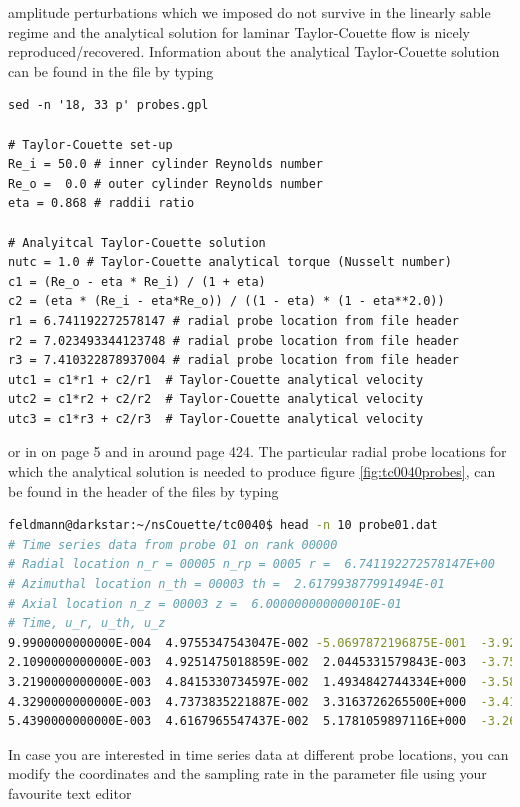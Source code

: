 \documentclass[a4paper, 11pt, DIV=11]{scrartcl}
\begin{document}
amplitude perturbations which we imposed do not survive in the linearly sable 
regime and the analytical solution for laminar Taylor-Couette flow is nicely 
reproduced/recovered. Information about the analytical Taylor-Couette solution can be 
found in the  file by typing \eg
\begin{lstlisting}[language=Gnuplot]
sed -n '18, 33 p' probes.gpl 

# Taylor-Couette set-up
Re_i = 50.0 # inner cylinder Reynolds number
Re_o =  0.0 # outer cylinder Reynolds number
eta = 0.868 # raddii ratio

# Analyitcal Taylor-Couette solution
nutc = 1.0 # Taylor-Couette analytical torque (Nusselt number)
c1 = (Re_o - eta * Re_i) / (1 + eta)
c2 = (eta * (Re_i - eta*Re_o)) / ((1 - eta) * (1 - eta**2.0))
r1 = 6.741192272578147 # radial probe location from file header
r2 = 7.023493344123748 # radial probe location from file header
r3 = 7.410322878937004 # radial probe location from file header
utc1 = c1*r1 + c2/r1  # Taylor-Couette analytical velocity
utc2 = c1*r2 + c2/r2  # Taylor-Couette analytical velocity
utc3 = c1*r3 + c2/r3  # Taylor-Couette analytical velocity
\end{lstlisting}
or \eg in \cite{Shi2015} on page \num{5} and in \cite{Brauckmann2016} around 
page \num{424}. The particular radial probe locations for which the analytical 
solution is needed to produce figure \ref{fig:tc0040probes}, can be found in the 
header of the  files by typing
\begin{lstlisting}[language=bash]
feldmann@darkstar:~/nsCouette/tc0040$ head -n 10 probe01.dat
# Time series data from probe 01 on rank 00000
# Radial location n_r = 00005 n_rp = 0005 r =  6.741192272578147E+00
# Azimuthal location n_th = 00003 th =  2.617993877991494E-01
# Axial location n_z = 00003 z =  6.000000000000010E-01
# Time, u_r, u_th, u_z 
9.9900000000000E-004  4.9755347543047E-002 -5.0697872196875E-001  -3.9262289916098E-001
2.1090000000000E-003  4.9251475018859E-002  2.0445331579843E-003  -3.7513595580142E-001
3.2190000000000E-003  4.8415330734597E-002  1.4934842744334E+000  -3.5808738661681E-001
4.3290000000000E-003  4.7373835221887E-002  3.3163726265500E+000  -3.4181516483879E-001
5.4390000000000E-003  4.6167965547437E-002  5.1781059897116E+000  -3.2637614051804E-001
\end{lstlisting}
In case you are interested in time series data at different probe locations, you 
can modify the coordinates and the sampling rate in the parameter file using 
your favourite text editor
\end{document}
